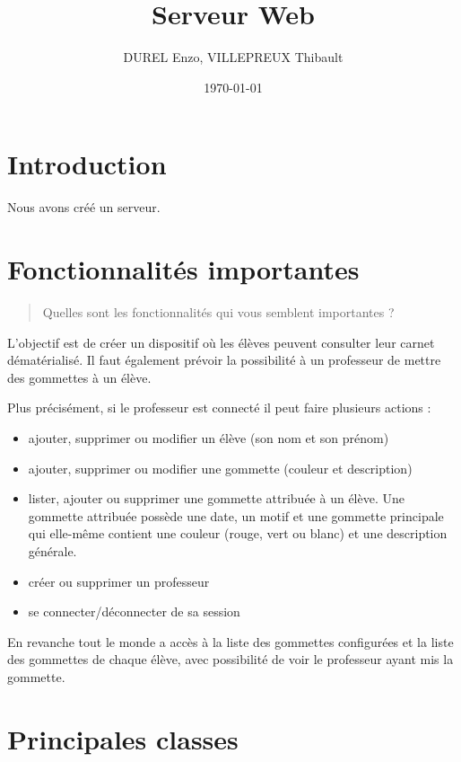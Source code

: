 \documentclass[11pt]{article}
\author{DUREL Enzo, VILLEPREUX Thibault}
\date{\today}
\title{Serveur Web}
\begin{document}
\maketitle
\thispagestyle{fancy}
\newpage

\section{Introduction}
\label{sec:org419efd4}

Nous avons créé un serveur.

\section{Fonctionnalités importantes}
\label{sec:org8cb6a27}

\begin{quote}
Quelles sont les fonctionnalités qui vous semblent importantes ?
\end{quote}

L'objectif est de créer un dispositif où les élèves peuvent consulter leur carnet dématérialisé. Il faut également prévoir la possibilité à un professeur de mettre des gommettes à un élève.

Plus précisément, si le professeur est connecté il peut faire plusieurs actions :
\begin{itemize}
\item ajouter, supprimer ou modifier un élève (son nom et son prénom)
\item ajouter, supprimer ou modifier une gommette (couleur et description)
\item lister, ajouter ou supprimer une gommette attribuée à un élève. Une gommette attribuée possède une date, un motif et une gommette principale qui elle-même contient une couleur (rouge, vert ou blanc) et une description générale.
\item créer ou supprimer un professeur
\item se connecter/déconnecter de sa session
\end{itemize}

En revanche tout le monde a accès à la liste des gommettes configurées et la liste des gommettes de chaque élève, avec possibilité de voir le professeur ayant mis la gommette.

\section{Principales classes}
\label{sec:org777d0c3}
\end{document}
